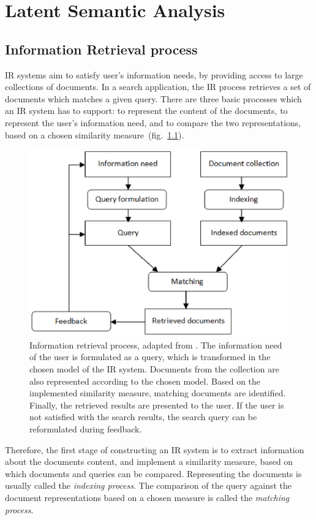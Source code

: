 \chapter{Latent Semantic Analysis}
\label{sec:lsa}

 
\section{Information Retrieval process}
\gls{IR} systems aim to satisfy user's information needs, by providing access to large collections of documents.  In a search application, the \gls{IR} process retrieves a set of documents which matches a given query. There are three basic processes which an \gls{IR} system has to support: to represent the content of the documents, to represent the user's information need, and to compare the two representations, based on a chosen similarity measure~(fig.~\ref{lsa:fig:ir_process}).
%
%
\begin{figure}[htbp]
	\centering
	\includegraphics[scale=0.7]{img/IR} 
	\caption[Information Retrieval process]%
           {Information retrieval process, adapted from \cite{IRmodels09}. The information need of the user is formulated as a query, which is transformed in the chosen model of the \gls{IR} system. Documents from the collection are also represented according to the chosen model. Based on the implemented similarity measure, matching documents are identified. Finally, the retrieved results are presented to the user. If the user is not satisfied with the search results, the search query can be reformulated during feedback.}
\label{lsa:fig:ir_process}
\end{figure} 
Therefore, the first stage of constructing an \gls{IR} system is to extract information about the documents content, and implement a similarity measure, based on which documents and queries can be compared. Representing the documents is usually called the \textit{indexing process}. The comparison of the query against the document representations based on a chosen measure is called the \textit{matching process}.\\

